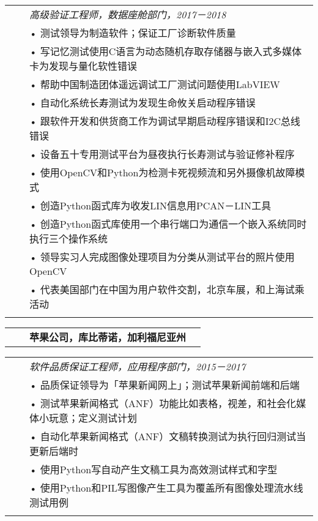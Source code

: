 \documentclass{minimal}
\begin{document}
\begin{CJK*}{UTF8}{gbsn}
\begin{tabular}{ p{1.5cm} p{1cm} p{16cm} }
& & \textit{高级验证工程师，数据座舱部门，2017－2018}\\
& & • 测试领导为制造软件；保证工厂诊断软件质量\\
& & • 写记忆测试使用C语言为动态随机存取存储器与嵌入式多媒体卡为发现与量化软性错误\\
& & • 帮助中国制造团体遥远调试工厂测试问题使用LabVIEW\\
& & • 自动化系统长寿测试为发现生命攸关启动程序错误\\
& & • 跟软件开发和供货商工作为调试早期启动程序错误和I2C总线错误\\
& & • 设备五十专用测试平台为昼夜执行长寿测试与验证修补程序\\
& & • 使用OpenCV和Python为检测卡死视频流和另外摄像机故障模式\\
& & • 创造Python函式库为收发LIN信息用PCAN－LIN工具\\
& & • 创造Python函式库使用一个串行端口为通信一个嵌入系统同时执行三个操作系统\\
& & • 领导实习人完成图像处理项目为分类从测试平台的照片使用OpenCV\\
& & • 代表美国部门在中国为用户软件交割，北京车展，和上海试乘活动\\
& & \\
\end{tabular}

\begin{tabular}{ p{1.5cm} p{1cm} p{10cm} >{\raggedleft\arraybackslash}p{3cm} }
& & \textbf{苹果公司，库比蒂诺，加利福尼亚州} & \\
\end{tabular}

\begin{tabular}{ p{1.5cm} p{1cm} p{16cm} }
& & \textit{软件品质保证工程师，应用程序部门，2015－2017}\\
& & • 品质保证领导为「苹果新闻网上」；测试苹果新闻前端和后端\\
& & • 测试苹果新闻格式（ANF）功能比如表格，视差，和社会化媒体小玩意；定义测试计划\\
& & • 自动化苹果新闻格式（ANF）文稿转换测试为执行回归测试当更新后端时\\
& & • 使用Python写自动产生文稿工具为高效测试样式和字型\\
& & • 使用Python和PIL写图像产生工具为覆盖所有图像处理流水线测试用例\\
& & \\
\end{tabular}


\end{CJK*}
\end{document}
